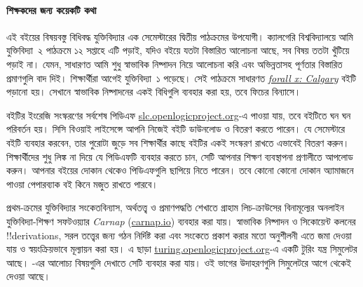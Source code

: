 \paragraph{শিক্ষকদের জন্য কয়েকটি কথা} এই বইয়ের বিষয়বস্তু
বিধিবদ্ধ যুক্তিবিদ্যার এক সেমেস্টারের দ্বিতীয় পাঠক্রমের
উপযোগী। ক্যালগেরি বিশ্ববিদ্যালয়ে আমি যুক্তিবিদ্যা~২ পাঠক্রমে
১২ সপ্তাহে এটি পড়াই, যদিও বইয়ে যতটা বিস্তারিত আলোচনা আছে, সব
বিষয় ততটা খুঁটিয়ে পড়াই না। যেমন, সাধারণত আমি শুধু স্বাভাবিক
নিষ্পাদন নিয়ে আলোচনা করি এবং অভিন্নতাসহ পূর্ণতার বিস্তারিত
প্রমাণগুলি বাদ দিই। শিক্ষার্থীরা আগেই যুক্তিবিদ্যা~১ পড়েছে।
সেই পাঠক্রমে সাধারণত
\emph{\href{https://forallx.openlogicproject.org}{forall x: Calgary}}
বইটি পড়ানো হয়। সেখানে স্বাভাবিক নিষ্পাদনের একই বিধিগুলি ব্যবহার
করা হয়, তবে ফিচের বিন্যাসে।

বইটির ইংরেজি সংস্করণের সর্বশেষ পিডিএফ
\href{https://slc.openlogicproject.org}{slc.openlogicproject.org}-এ
পাওয়া যায়, তবে বইটিতে ঘন ঘন পরিবর্তন হয়। সিসি বিওয়াই লাইসেন্সে
আপনি নিজেই বইটি ডাউনলোড ও বিতরণ করতে পারেন। যে সেমেস্টারে বইটি
ব্যবহার করবেন, তার পুরোটা জুড়ে সব শিক্ষার্থীর কাছে বইটির একই
সংস্করণ রাখতে এভাবেই বিতরণ করুন। শিক্ষার্থীদের শুধু লিঙ্ক না দিয়ে
যে পিডিএফটি ব্যবহার করতে চান, সেটি আপনার শিক্ষণ ব্যবস্থাপনা
প্রণালীতে আপলোড করুন। আপনার বইয়ের দোকান থেকেও পিডিএফগুলি
ছাপিয়ে নিতে পারেন। তবে কোনো কোনো দোকান অ্যামাজনে পাওয়া
পেপারব্যাক বই কিনে মজুত রাখতে পারবে।

প্রথম-ক্রমের যুক্তিবিদ্যার সংকেতবিন্যাস, অর্থতত্ত্ব ও প্রমাণপদ্ধতি
শেখাতে গ্রাহাম লিচ-ক্রাউসের বিনামূল্যের অনলাইন যুক্তিবিদ্যা-শিক্ষণ
সফটওয়্যার \emph{Carnap}
(\href{https://carnap.io}{carnap.io}) ব্যবহার করা যায়। স্বাভাবিক
নিষ্পাদন ও সিকোয়েন্ট কলনের !!{derivation}s, সরল তত্ত্বের জন্য গঠন
নির্দিষ্ট করা এবং সংকেতে প্রকাশ করার মতো অনুশীলনী এতে জমা দেওয়া
যায় ও স্বয়ংক্রিয়ভাবে মূল্যায়ন করা হয়। এ ছাড়া
\href{https://turing.openlogicproject.org}{turing.openlogicproject.org}-এ
একটি টুরিং যন্ত্র সিমুলেটর আছে। -এর আলোচ্য
বিষয়গুলি দেখাতে সেটি ব্যবহার করা যায়। ওই ভাগের উদাহরণগুলি
সিমুলেটরে আগে থেকেই দেওয়া আছে।
